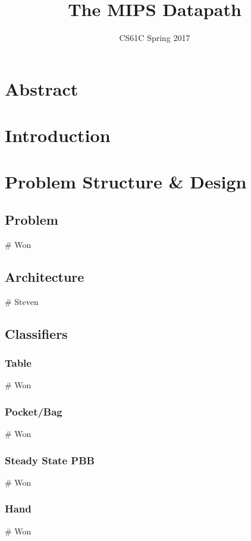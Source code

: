 \documentclass{article}
\title{The MIPS Datapath}
\author{CS61C Spring 2017}
\date{ }
\begin{document}
\maketitle
\tableofcontents
\newpage

\section{Abstract}
\section{Introduction}

\section{Problem Structure \& Design}
\subsection{Problem}
# Won

\subsection{Architecture}
# Steven

\subsection{Classifiers}
\subsubsection{Table}
# Won
\subsubsection{Pocket/Bag}
# Won
\subsubsection{Steady State PBB}
# Won
\subsubsection{Hand}
# Won
\end{document}
